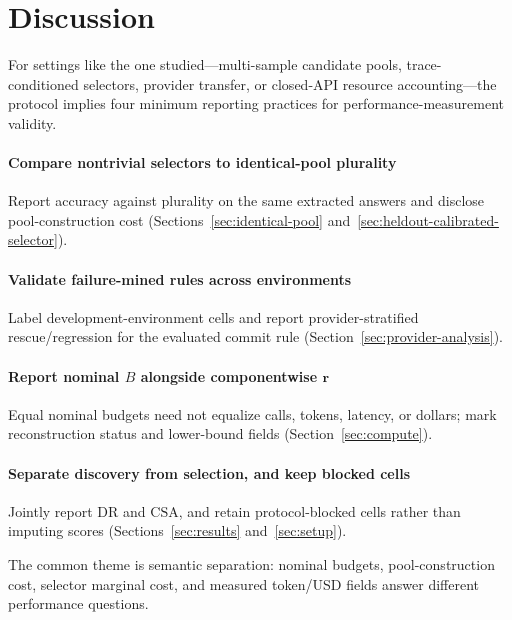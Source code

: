 \section{Discussion}
\label{sec:discussion}

For settings like the one studied---multi-sample candidate pools, trace-conditioned selectors,
provider transfer, or closed-API resource accounting---the protocol implies four minimum reporting
practices for performance-measurement validity.

\paragraph{Compare nontrivial selectors to identical-pool plurality}
Report accuracy against plurality on the same extracted answers and disclose pool-construction cost
(Sections~\ref{sec:identical-pool} and~\ref{sec:heldout-calibrated-selector}).

\paragraph{Validate failure-mined rules across environments}
Label development-environment cells and report provider-stratified rescue/regression for the
evaluated commit rule (Section~\ref{sec:provider-analysis}).

\paragraph{Report nominal $B$ alongside componentwise $\mathbf{r}$}
Equal nominal budgets need not equalize calls, tokens, latency, or dollars; mark reconstruction
status and lower-bound fields (Section~\ref{sec:compute}).

\paragraph{Separate discovery from selection, and keep blocked cells}
Jointly report $\mathrm{DR}$ and $\mathrm{CSA}$, and retain protocol-blocked cells rather than
imputing scores (Sections~\ref{sec:results} and~\ref{sec:setup}).

The common theme is semantic separation: nominal budgets, pool-construction cost, selector marginal
cost, and measured token/USD fields answer different performance questions.
